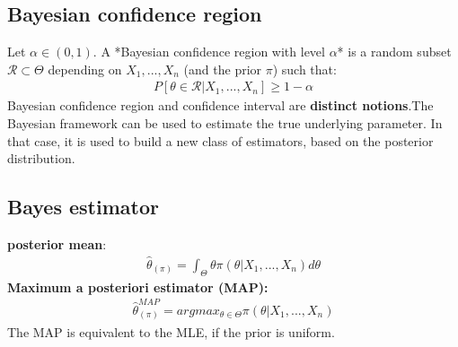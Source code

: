 \subsection{Bayesian confidence region}
Let $\alpha \in (0, 1)$. A *Bayesian confidence region with level $\alpha$* is a random subset $\mathcal{R} \subset \Theta$ depending on $X_1,...,X_n$ (and the prior $\pi$) such that:
\begin{align*}
P[\theta \in \mathcal{R} | X_1,...,X_n] \geq 1 - \alpha
\end{align*}
Bayesian confidence region and confidence interval are \textbf{distinct notions}.The Bayesian framework can be used to estimate the true underlying parameter. In that case, it is used to build a new class of estimators, based on the posterior distribution.
\subsection{Bayes estimator}

\textbf{posterior mean}:
\begin{align*}
\hat{\theta}_{(\pi)} = \int_\Theta\theta\pi(\theta | X_1,...,X_n)d\theta
\end{align*}
\textbf{Maximum a posteriori estimator (MAP):}
\begin{align*}
\hat{\theta}^{MAP}_{(\pi)} = argmax_{\theta\in\Theta}\pi(\theta | X_1,...,X_n)
\end{align*}
The MAP is equivalent to the MLE, if the prior is uniform.